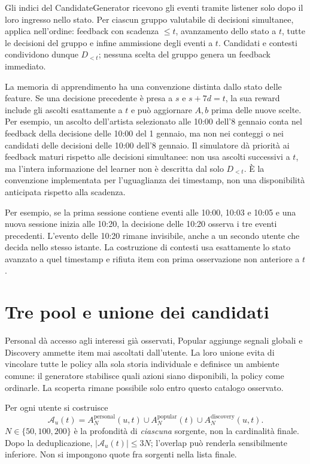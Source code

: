 Gli indici del CandidateGenerator ricevono gli eventi tramite listener solo dopo il loro ingresso nello stato. Per ciascun gruppo valutabile di decisioni simultanee,  applica nell'ordine: feedback con scadenza $\leq t$, avanzamento dello stato a $t$, tutte le decisioni del gruppo e infine ammissione degli eventi a $t$. Candidati e contesti condividono dunque $D_{<t}$; nessuna scelta del gruppo genera un feedback immediato.

La memoria di apprendimento ha una convenzione distinta dallo stato delle feature. Se una decisione precedente è presa a $s$ e $s+7d=t$, la sua reward include gli ascolti esattamente a $t$ e può aggiornare $A,b$ prima delle nuove scelte. Per esempio, un ascolto dell'artista selezionato alle 10:00 dell'8 gennaio conta nel feedback della decisione delle 10:00 del 1 gennaio, ma non nei conteggi o nei candidati delle decisioni delle 10:00 dell'8 gennaio. Il simulatore dà priorità ai feedback maturi rispetto alle decisioni simultanee: non usa ascolti successivi a $t$, ma l'intera informazione del learner non è descritta dal solo $D_{<t}$. È la convenzione implementata per l'uguaglianza dei timestamp, non una disponibilità anticipata rispetto alla scadenza.

Per esempio, se la prima sessione contiene eventi alle 10:00, 10:03 e 10:05 e una nuova sessione inizia alle 10:20, la decisione delle 10:20 osserva i tre eventi precedenti. L'evento delle 10:20 rimane invisibile, anche a un secondo utente che decida nello stesso istante. La costruzione di contesti usa esattamente lo stato avanzato a quel timestamp e rifiuta item con prima osservazione non anteriore a $t$.

\section{Tre pool e unione dei candidati}
Personal dà accesso agli interessi già osservati, Popular aggiunge segnali globali e Discovery ammette item mai ascoltati dall'utente. La loro unione evita di vincolare tutte le policy alla sola storia individuale e definisce un ambiente comune: il generatore stabilisce quali azioni siano disponibili, la policy come ordinarle. La scoperta rimane possibile solo entro questo catalogo osservato.

Per ogni utente si costruisce
\begin{equation}
\mathcal A_u(t)=A_N^{\mathrm{personal}}(u,t)\cup
A_N^{\mathrm{popular}}(t)\cup A_N^{\mathrm{discovery}}(u,t).\label{eq:pool}
\end{equation}
$N\in\{50,100,200\}$ è la profondità di \emph{ciascuna} sorgente, non la cardinalità finale. Dopo la deduplicazione, $|\mathcal A_u(t)|\leq3N$; l'overlap può renderla sensibilmente inferiore. Non si impongono quote fra sorgenti nella lista finale.

